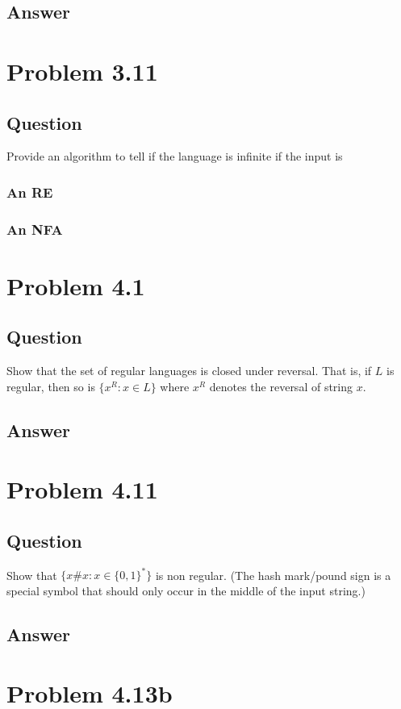 \documentclass[12pt, a4paper]{article}
\begin{document}
\subsection{Answer}

\section{Problem 3.11}
\subsection{Question}
Provide an algorithm to tell if the language is infinite if the input is
\subsubsection{An RE}
\subsubsection{An NFA}

\section{Problem 4.1}
\subsection{Question}
Show that the set of regular languages is closed under reversal. That is, if $L$ is regular, then so is $\{x^{R} : x \in L\}$ where $x^{R}$ denotes the reversal of string $x$.
\subsection{Answer}

\section{Problem 4.11}
\subsection{Question}
Show that $\{x\#x : x \in \{0,1\}^{*}\}$ is non regular. (The hash mark/pound sign is a special symbol that should only occur in the middle of the input string.)
\subsection{Answer}

\section{Problem 4.13b}
\end{document}
